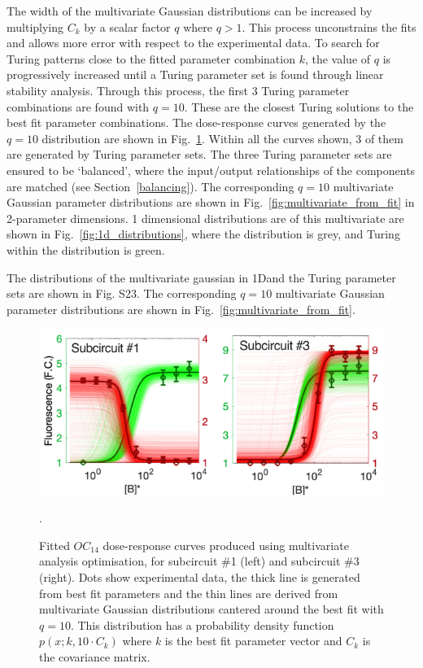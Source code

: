 The width of the multivariate Gaussian distributions can be increased by multiplying $C_k$ by a scalar factor $q$ where $q>1$.
This process unconstrains the fits and allows more error with respect to the experimental data.
To search for Turing patterns close to the fitted parameter combination $k$, the value of $q$ is progressively increased until a Turing parameter set is found through linear stability analysis.
Through this process, the first 3 Turing parameter combinations are found with $q=10$.
These are the closest Turing solutions to the best fit parameter combinations.
The dose-response curves generated by the $q=10$ distribution are shown in Fig.~\ref{fig:dose_response_multivariate_gaussian}.
Within all the curves shown, 3 of them are generated by Turing parameter sets.
The three Turing parameter sets are ensured to be ‘balanced’, where the input/output relationships of the components are matched (see Section~\ref{balancing}).
The corresponding $q=10$ multivariate Gaussian parameter distributions are shown in Fig.~\ref{fig:multivariate_from_fit} in 2-parameter dimensions.
1 dimensional distributions are of this multivariate are shown in Fig.~\ref{fig:1d_distributions}, where the distribution is grey, and Turing within the distribution is green.

The distributions of the multivariate gaussian in 1Dand the Turing parameter sets are shown in Fig. S23.
The corresponding $q=10$ multivariate Gaussian parameter distributions are shown in Fig.~\ref{fig:multivariate_from_fit}.
\begin{figure}[H] %
    \centering
    \begin{adjustbox}{center}
        \includegraphics[width=1\textwidth]{chapters/Chapter 2/dose_response_multivariate_gaussian} %
    \end{adjustbox}
    \caption{Fitted $OC_14$ dose-response curves produced using multivariate analysis optimisation, for subcircuit \#1 (left) and subcircuit \#3 (right). Dots show experimental data, the thick line is generated from best fit parameters and the thin lines are derived from multivariate Gaussian distributions cantered around the best fit with $q=10$. This distribution has a probability density function $p(x;k,10\cdot C_{k})$ where $k$ is the best fit parameter vector and $C_{k}$ is the covariance matrix.}.
    \label{fig:dose_response_multivariate_gaussian} %
\end{figure}


